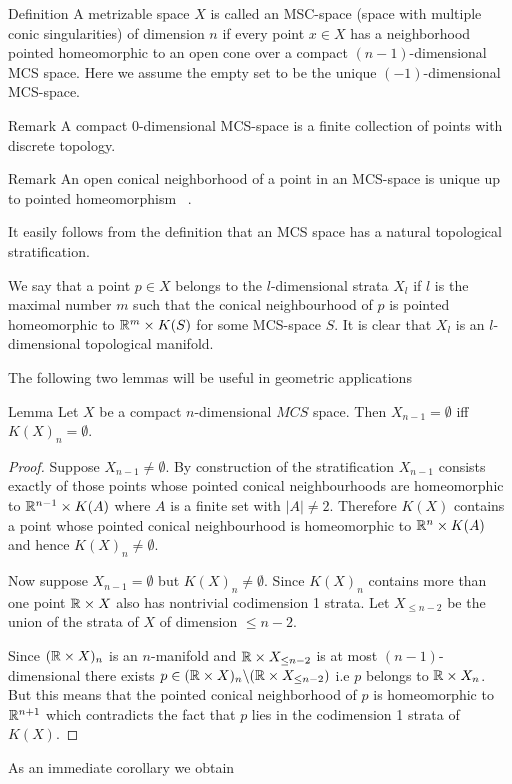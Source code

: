 \begin{thm}{Definition}
A metrizable space $X$ is called an MSC-space (space with multiple conic singularities) of dimension $n$ if  every point $x\in X$ has a neighborhood pointed homeomorphic to an open cone over a compact  $(n-1)$-dimensional MCS space. Here we assume the empty set to be the unique $(-1)$-dimensional MCS-space.  
\end{thm}

\begin{thm}{Remark}
A compact $0$-dimensional MCS-space is a finite collection of points with discrete topology.
\end{thm}

\begin{thm}{Remark}
An open conical neighborhood of a point in an MCS-space is unique up to pointed homeomorphism ~\cite{Kwun}.
\end{thm}

It easily follows from the definition that an MCS space  has a natural topological stratification.

We say that a point $p\in X$ belongs to the $l$-dimensional strata $X_l$ if $l$ is the maximal number $m$ such that the conical neighbourhood 
of $p$ is pointed homeomorphic to $\RR^m\times K(S)$  for some  MCS-space $S$. It is clear that $X_l$ is an $l$-dimensional topological manifold.


The following two  lemmas will be useful in geometric applications

\begin{thm}{Lemma}\label{n-1-strat}
Let $X$ be a  compact $n$-dimensional $MCS$ space. Then $X_{n-1}=\emptyset$ iff $K(X)_{n}=\emptyset$.
\end{thm}
\begin{proof}
 Suppose $X_{n-1}\ne\emptyset$.
By construction of the stratification $X_{n-1}$ consists exactly of those points whose pointed conical neighbourhoods are homeomorphic to $\RR^{n-1}\times K(A)$ where $A$ is a finite set with $|A|\ne 2$. Therefore $K(X)$ contains a point whose  pointed conical neighbourhood is homeomorphic to $\RR^{n}\times K(A)$ and hence $K(X)_{n}\ne\emptyset$.

Now suppose $X_{n-1}=\emptyset$ but  $K(X)_{n}\ne\emptyset$. Since $K(X)_{n}$ contains more than one point $\RR\times X$ also has nontrivial codimension 1 strata.   Let $X_{\le n-2}$ be the union of the strata of $X$ of dimension $\le n-2$.

Since $(\RR\times X)_n$ is an $n$-manifold and  $\RR\times X_{\le n-2}$ is at most $(n-1)$-dimensional there exists $p\in (\RR\times X)_n\backslash (\RR\times X_{\le n-2})$ i.e $p$ belongs to $\RR\times X_n$. But this means that  the pointed conical neighborhood of $p$ is homeomorphic to $\mathbb{R}^{n+1}$ which contradicts the fact that $p$ lies in the  codimension 1 strata of $K(X)$.
\end{proof}
As an immediate corollary we obtain

